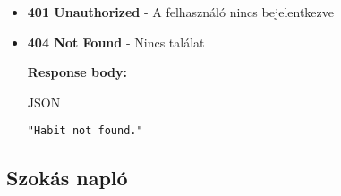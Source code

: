 \documentclass[12pt]{report}
\begin{document}
\begin{description}
\begin{itemize}
      \item \textbf{401 Unauthorized} - A felhasználó nincs bejelentkezve

      \item \textbf{404 Not Found} - Nincs találat

        \textbf{Response body:}
        \begin{codeblock}{JSON}
          \begin{verbatim}
"Habit not found."
          \end{verbatim}
        \end{codeblock}
    \end{itemize}
\end{description}

\subsection{Szokás napló}
\end{document}
